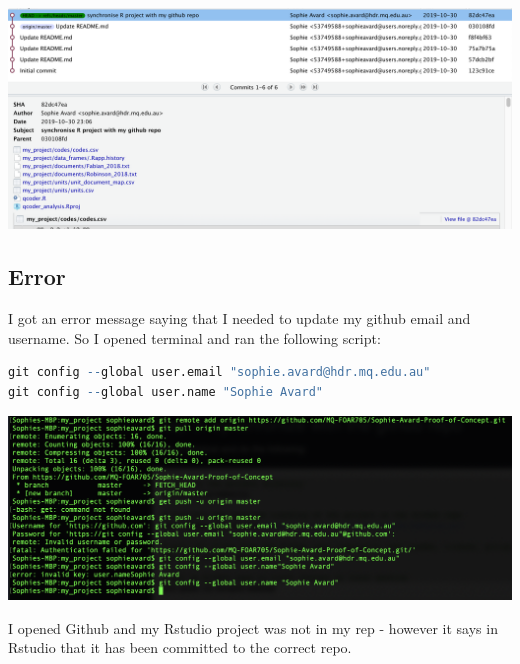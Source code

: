 \documentclass{article}
\begin{document}
\includegraphics[width=\textwidth]{review-git-commits.png}

\subsection{Error}
I got an error message saying that I needed to update my github email and username. So I opened terminal and ran the following script:
\begin{lstlisting}[language=R]
git config --global user.email "sophie.avard@hdr.mq.edu.au"
git config --global user.name "Sophie Avard"
\end{lstlisting}
\includegraphics[width=\textwidth]{sync-poc-with-github.png}

I opened Github and my Rstudio project was not in my rep - however it says in Rstudio that it has been committed to the correct repo. 
\end{document}
